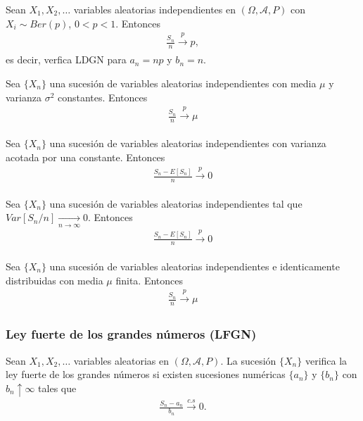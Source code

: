 \begin{teo}[Bernoulli, 1713]
    Sean $X_1,X_2,\ldots$ variables aleatorias independientes en $(\Omega, \mathcal{A}, P)$ con $X_i \sim Ber(p)$, $0<p<1$. Entonces
    \begin{align*}
        \frac{S_n}{n} \xrightarrow[\quad]{p} p,
    \end{align*}
    es decir, verfica LDGN para $a_n = np$ y $b_n = n$.
\end{teo}

\begin{teo}[Chebyshev]
    Sea $\{X_n\}$ una sucesión de variables aleatorias independientes con media $\mu$ y varianza $\sigma^2$ constantes. Entonces
    \begin{align*}
        \frac{S_n}{n} \xrightarrow[\quad]{p} \mu
    \end{align*}
\end{teo}

\begin{teo}[Chebyshev]
    Sea $\{X_n\}$ una sucesión de variables aleatorias independientes con varianza acotada por una constante. Entonces
    \begin{align*}
        \frac{S_n - E[S_n]}{n} \xrightarrow[\quad]{p} 0
    \end{align*}
\end{teo}

\begin{teo}[Markov]
    Sea $\{X_n\}$ una sucesión de variables aleatorias independientes tal que $Var[S_n/n] \xrightarrow[n\to \infty]{} 0$. Entonces
    \begin{align*}
        \frac{S_n - E[S_n]}{n} \xrightarrow[\quad]{p} 0
    \end{align*}
\end{teo}

\begin{teo}[Khinchin]
    Sea $\{X_n\}$ una sucesión de variables aleatorias independientes e identicamente distribuidas con media $\mu$ finita. Entonces
    \begin{align*}
        \frac{S_n}{n} \xrightarrow[\quad]{p} \mu
    \end{align*}
\end{teo}

\subsubsection{Ley fuerte de los grandes números (LFGN)}
Sean $X_1,X_2,\ldots$ variables aleatorias en $(\Omega, \mathcal{A}, P)$. La sucesión $\{X_n\}$ verifica la ley fuerte de los grandes números si existen sucesiones numéricas $\{a_n\}$ y $\{b_n\}$ con $b_n \uparrow \infty$ tales que
\begin{align*}
    \frac{S_n - a_n}{b_n} \xrightarrow[]{c.s} 0.
\end{align*}

